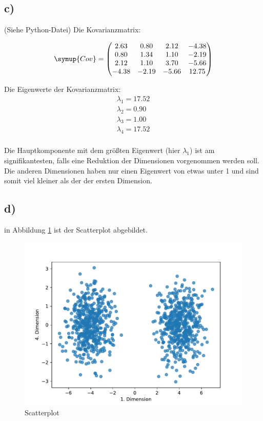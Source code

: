 \subsection{c)}
(Siehe Python-Datei) Die Kovarianzmatrix:

\begin{align*}
  \symup{Cov} = \begin{pmatrix}
                 2.63 &  0.80 &  2.12 & -4.38  \\
                 0.80 &  1.34 &  1.10 & -2.19 \\
                 2.12 &  1.10 &  3.70 & -5.66 \\
                -4.38 & -2.19 & -5.66 & 12.75 \\
  \end{pmatrix}
\end{align*}

Die Eigenwerte der Kovarianzmatrix:
\begin{align*}
  \lambda_1 = 17.52 \\
  \lambda_2 = 0.90 \\
  \lambda_3 = 1.00 \\
  \lambda_4 = 17.52 \\
\end{align*}

Die Hauptkomponente mit dem größten Eigenwert (hier $\lambda_1$) ist am
signifikantesten, falls eine Reduktion der Dimensionen vorgenommen werden soll.
Die anderen Dimensionen haben nur einen Eigenwert von etwas unter 1 und sind somit
viel kleiner als der der ersten Dimension.

\subsection{d)}
in Abbildung \ref{abb:2} ist der Scatterplot abgebildet.

\begin{figure}
  \centering
  \includegraphics[scale=0.7]{Aufgabe14/Scatterplot_pca.pdf}
  \caption{Scatterplot}
  \label{abb:2}
\end{figure}

